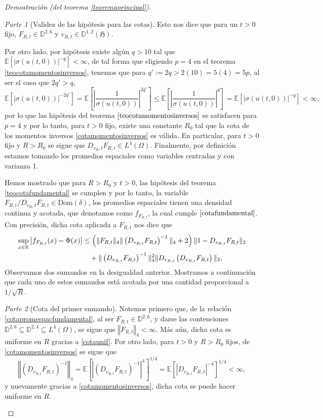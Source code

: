 \documentclass[letterpaper,twoside,12pt]{book}
\newcommand{\R}{\mathbb{R}}
\newcommand{\D}{\mathbb{D}}
\newcommand{\E}{\mathbb{E}}
\newcommand{\1}{\mathds{1}}
\newcommand{\abs}[1]{\left\lvert #1 \right\rvert}
\newcommand{\norm}[1]{\left\Vert #1 \right\Vert}
\theoremstyle{definition}
\theoremstyle{definition}
\theoremstyle{remark}
\newtheorem{proofpart}{Parte}
\theoremstyle{definition}
\theoremstyle{definition}
\theoremstyle{definition}
\theoremstyle{definition}
\theoremstyle{definition}
\begin{document}
\begin{proof}[Demostración (del teorema \ref{teoremaprincipal})]
\begin{proofpart}[Validez de las hipótesis para las cotas]
Esto nos dice que para un $t>0$ fijo, $F_{R,t}\in \D^{2,6}$ y $v_{R,t}\in \D^{1,2}(\mathfrak{H})$. 

Por otro lado, por hipótesis existe algún $q>10$ tal que $\E\left[\abs{\sigma(u(t,0))}^{-q}\right]<\infty$, de tal forma que eligiendo $p=4$ en el teorema \ref{teocotamomentosinversos}, tenemos que para $q':=2q>2(10)=5(4)=5p$, al ser el caso que $2q'>q$,
\[
\E\left[\abs{\sigma(u(t,0))}^{-2q'}\right]=\E\left[\abs{\frac{1}{\sigma(u(t,0))}}^{2q'}\right]\leq \E\left[\abs{\frac{1}{\sigma(u(t,0))}}^{q}\right]=\E\left[\abs{\sigma(u(t,0))}^{-q}\right]<\infty,
\]
por lo que las hipótesis del teorema $\ref{teocotamomentosinversos}$ se satisfacen para $p=4$ y por lo tanto, para $t>0$ fijo, existe una constante $R_0$ tal que la cota de los momentos inversos \eqref{cotamomentosinversos} es válida. En particular, para $t>0$ fijo y $R>R_0$ se sigue que $D_{v_R,t}F_{R,t}\in L^{4}(\Omega)$. Finalmente, por definición estamos tomando los promedios espaciales como variables centradas y con varianza 1. 

Hemos mostrado que para $R>R_0$ y $t>0$, las hipótesis del teorema \ref{teocotafundamental} se cumplen y por lo tanto, la variable $F_{R,t}/D_{v_R,t}F_{R,t}\in \text{Dom}(\delta)$, los promedios espaciales tienen una densidad continua y acotada, que denotamos como $f_{F_{R,t}}$, la cual cumple $\eqref{cotafundamental}$. Con precisión, dicha cota aplicada a $F_{R,t}$ nos dice que 
\begin{align}\label{cotapromespacfundamental}
   \sup_{x\in \R} \abs{f_{F_{R,t}}(x)-\Phi(x)}&\leq \left(\|F_{R,t}\|_4\|\left(D_{v_{R,t}}F_{R,t}\right)^{-1}\|_4+2\right)\|1-D_{v_{R,t}}F_{R,t}\|_2\notag\\
   &\ \ \ +\|\left(D_{v_{R,t}}F_{R,t}\right)^{-1}\|^{2}_4\|D_{v_{R,t}} \left(D_{v_{R,t}}F_{R,t}\right)\|_2,
\end{align}
Observamos dos sumandos en la desigualdad anterior. Mostramos a continuación que cada uno de estos sumandos está acotada por una cantidad proporcional a $1/\sqrt{R}$.
\end{proofpart}
\begin{proofpart}[Cota del primer sumando]
Notemos primero que, de la relación \eqref{cotapromespacfundamental}, al ser $F_{R,t}\in \D^{2,6}$, y darse las contenciones $\D^{2,6}\subseteq \D^{2,4}\subseteq{L^{4}}(\Omega)$, se sigue que $\norm{F_{R,t}}_4<\infty$. Más aún, dicha cota es uniforme en $R$ gracias a \eqref{cotaunif}. Por otro lado, para $t>0$ y $R>R_0$ fijos, de \eqref{cotamomentosinversos} se sigue que 
\begin{equation}\label{cotapromespacmomentosinversos}
   \norm{(D_{v_{R,t}}F_{R,t})^{-1}}_4=\E\left[\abs{\left(D_{v_{R,t}}F_{R,t}\right)^{-1}}^{4}\right]^{1/4}=\E\left[\abs{D_{v_{R,t}}F_{R,t}}^{-4}\right]^{1/4}<\infty,
\end{equation}
y nuevamente gracias a \eqref{cotamomentosinversos}, dicha cota se puede hacer uniforme en $R$. 


\end{proofpart}
\end{proof}
\end{document}

